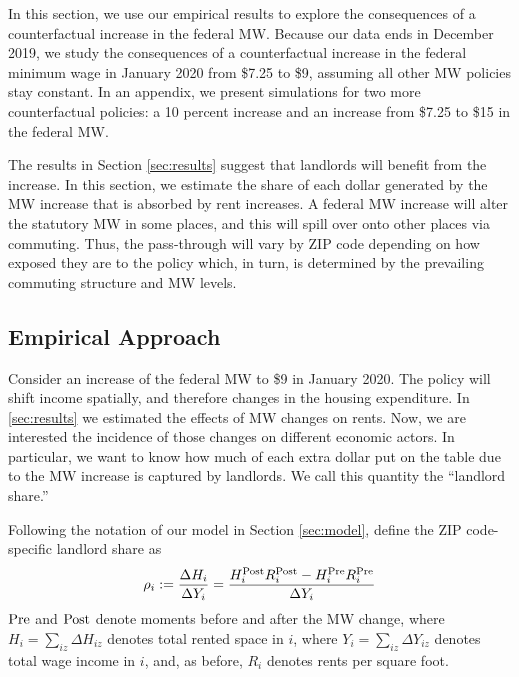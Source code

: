 
In this section, we use our empirical results to explore the consequences of 
a counterfactual increase in the federal MW.
Because our data ends in December 2019, we study the consequences of a 
counterfactual increase in the federal minimum wage in January 2020 from 
\$7.25 to \$9, assuming all other MW policies stay constant. 
In an appendix, we present simulations for two more counterfactual policies: 
a 10 percent increase and an increase from \$7.25 to \$15 in the federal MW.

The results in Section \ref{sec:results} suggest that landlords will benefit
from the increase. 
In this section, we estimate the share of each dollar generated by the MW 
increase that is absorbed by rent increases.
A federal MW increase will alter the statutory MW in some places, and this will
spill over onto other places via commuting.
Thus, the pass-through will vary by ZIP code depending on how exposed they
are to the policy which, in turn, is determined by the prevailing commuting
structure and MW levels.


\subsection{Empirical Approach}\label{sec:emp_cf}

Consider an increase of the federal MW to \$9 in January 2020.
The policy will shift income spatially, and therefore changes in 
the housing expenditure.
In \ref{sec:results} we estimated the effects of MW changes on rents.
Now, we are interested the incidence of those changes on different economic
actors.
In particular, we want to know how much of each extra dollar put on the table 
due to the MW increase is captured by landlords.
We call this quantity the ``landlord share.''

Following the notation of our model in Section \ref{sec:model}, define the 
ZIP code-specific landlord share as
\begin{equation*}\label{eq:share_landlords}
    \rho_i := \frac{\Delta H_i}{\Delta Y_i} 
            = \frac{H^{\text{Post}}_i R^{\text{Post}}_i - H^{\text{Pre}}_i R^{\text{Pre}}_i}{\Delta Y_i}
\end{equation*}
$\text{Pre}$ and $\text{Post}$ denote moments before and after the MW change,
where $H_i = \sum_{iz}\Delta H_{iz}$ denotes total rented space in $i$, 
where $Y_i = \sum_{iz}\Delta Y_{iz}$ denotes total wage income in $i$, 
and, as before,
$R_i$ denotes rents per square foot.

